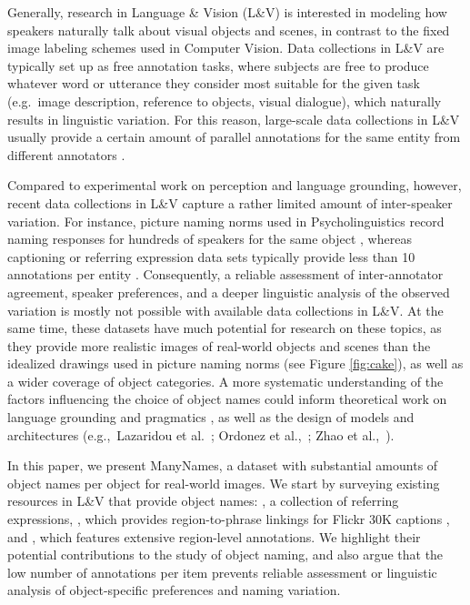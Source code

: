 Generally, research in Language \& Vision (L\&V) is interested in modeling how speakers naturally talk about visual objects and scenes, in contrast to the fixed image labeling schemes used in Computer Vision.
Data collections in L\&V are typically set up as free annotation tasks,  where subjects are free to produce whatever word or utterance they consider most suitable for the given task (e.g.\ image description, reference to objects, visual dialogue), which naturally results in linguistic variation.
For this reason, large-scale data collections in L\&V usually provide a certain amount of parallel annotations for the same entity from different annotators \cite{fangetal:2015,devlin:imcaqui,Kazemzadeh2014,mao15,vries2017guesswhat}.

Compared to experimental work on perception and language grounding, however, recent data collections in L\&V capture a rather limited amount of inter-speaker variation.
For instance, picture naming norms used in Psycholinguistics record naming responses for hundreds of speakers for the same object  \cite{snodgrass,rossion2004revisiting}, whereas captioning or referring expression data sets typically provide less than 10 annotations per entity \cite{devlin:imcaqui,Kazemzadeh2014,mao15}.
Consequently, a reliable assessment of inter-annotator agreement, speaker preferences, and a deeper linguistic analysis of the observed variation is mostly not possible with available data collections in  L\&V.
At the same time, these datasets have much potential for research on these topics, as they provide more realistic images of real-world objects and scenes than the idealized drawings used in picture naming norms (see Figure \ref{fig:cake}), as well as a wider coverage of object categories.
A more systematic understanding of the factors influencing the choice of object names could inform theoretical work on language grounding and pragmatics \cite{rohde2012communicating,graf2016animal}, as well as the design of models and architectures (e.g.,~Lazaridou et al.~; Ordonez et al.,~; Zhao et al.,~).

In this paper, we present ManyNames, a dataset with substantial amounts of object names per object for real-world images.
We start by surveying existing resources in L\&V that provide object names:  \cite{Yu2016}, a collection of referring expressions, \flickr \cite{plummer2015flickr30kentities}, which provides region-to-phrase linkings for Flickr 30K captions \cite{young:2014}, and \vgenome \cite{krishna2016visualgenome}, which features extensive region-level annotations. We highlight their potential contributions to the study of object naming, and also argue that the low number of annotations per item prevents reliable assessment or linguistic analysis of object-specific preferences and naming variation.

